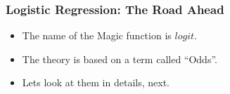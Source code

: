 \begin{frame}[fragile]\frametitle{Logistic Regression: The Road Ahead}
 \begin{itemize}
\item The name of the Magic function is $logit$.
\item The theory is based on a term called ``Odds''.
\item Lets look at them in details, next.
\end{itemize}

\end{frame}














